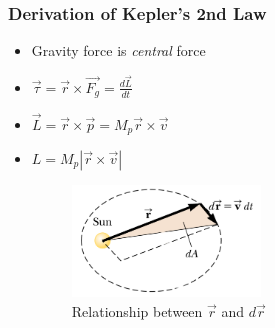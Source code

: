 \documentclass{beamer}
\begin{document}
\begin{frame}
\frametitle{Derivation of Kepler's 2nd Law}

\begin{itemize}

\item Gravity force is \textit{central} force

\item $
\vec{\tau} = \vec{r}\times\vec{F_g} = \frac{d\vec{L}}{dt}
$

\item $
 \vec{L} = \vec{r}\times \vec{p} = M_p \vec{r}\times\vec{v} 
 $

\item $
L = M_p \left|\vec{r} \times \vec{v}\right|
$

\begin{figure}[h] 
	\centering
		\includegraphics[width=5cm]{sun2.png}
	\caption{Relationship between  $\vec{r}$ and $d\vec{r}$}
	\label{fig:sun2}
\end{figure}





\end{itemize}


\end{frame}
\end{document}
